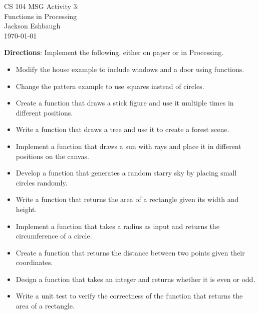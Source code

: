 \documentclass[11pt]{exam}
\newcommand{\myname}{Jackson Eshbaugh}
\newcommand{\myhwtype}{MSG Activity}
\newcommand{\myhwnum}{3}
\newcommand{\myclass}{CS 104}
\begin{document}
    \thispagestyle{plain}
    \begin{center}
    {\Large \myclass{} \myhwtype{} \myhwnum}:
        \\
        {\Large Functions in Processing}
        \\
        \myname{}\\
        \today
    \end{center}

    \textbf{Directions}: Implement the following, either on paper or in Processing.

\begin{itemize}
    \item Modify the house example to include windows and a door using functions.
    \item Change the pattern example to use squares instead of circles.
    \item Create a function that draws a stick figure and use it multiple times in different positions.
    \item Write a function that draws a tree and use it to create a forest scene.
    \item Implement a function that draws a sun with rays and place it in different positions on the canvas.
    \item Develop a function that generates a random starry sky by placing small circles randomly.
    \item Write a function that returns the area of a rectangle given its width and height.
    \item Implement a function that takes a radius as input and returns the circumference of a circle.
    \item Create a function that returns the distance between two points given their coordinates.
    \item Design a function that takes an integer and returns whether it is even or odd.
    \item Write a unit test to verify the correctness of the function that returns the area of a rectangle.
\end{itemize}
\end{document}
